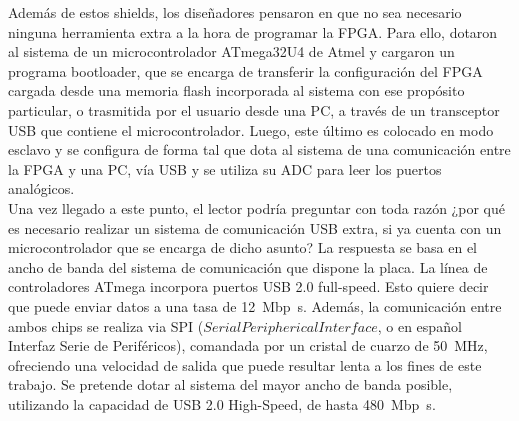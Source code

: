 Además de estos shields, los diseñadores pensaron en que no sea necesario ninguna herramienta extra a la hora de programar la FPGA. Para ello, dotaron al sistema de un microcontrolador ATmega32U4 de Atmel y cargaron un programa bootloader, que se encarga de transferir la configuración del FPGA cargada desde una memoria flash incorporada al sistema con ese propósito particular, o trasmitida por el usuario desde una PC, a través de un transceptor USB que contiene el microcontrolador. Luego, este último es colocado en modo esclavo y se configura de forma tal que dota al sistema de una comunicación entre la FPGA y una PC, vía USB y se utiliza su ADC para leer los puertos analógicos.\\%

Una vez llegado a este punto, el lector podría preguntar con toda razón ¿por qué es necesario realizar un sistema de comunicación USB extra, si ya cuenta con un microcontrolador que se encarga de dicho asunto? La respuesta se basa en el ancho de banda del sistema de comunicación que dispone la placa. La línea de controladores ATmega incorpora puertos USB 2.0 full-speed. Esto quiere decir que puede enviar datos a una tasa de \SI{12}{\mega bp\second}. Además, la comunicación entre ambos chips se realiza via SPI (\(Serial Peripherical Interface\), o en español Interfaz Serie de Periféricos), comandada por un cristal de cuarzo de \SI{50}{\mega\hertz}, ofreciendo una velocidad de salida que puede resultar lenta a los fines de este trabajo. Se pretende dotar al sistema del mayor ancho de banda posible, utilizando la capacidad de USB 2.0 High-Speed, de hasta \SI{480}{\mega bp\second}.\\

